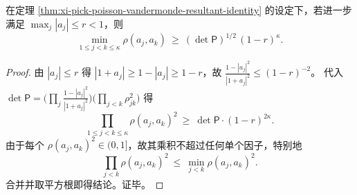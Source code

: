 \begin{corollary}[行列式下界推出伪双曲分离的充分条件]\label{cor:xi-pick-poisson-determinant-separation-sufficient}
在定理 \ref{thm:xi-pick-poisson-vandermonde-resultant-identity} 的设定下，若进一步满足 \(\max_j|a_j|\le r<1\)，则
\[
\min_{1\le j<k\le\kappa}\rho(a_j,a_k)
\ \ge\
(\det\mathsf P)^{1/2}\,(1-r)^{\kappa}.
\]
\end{corollary}
\begin{proof}
由 \(|a_j|\le r\) 得 \(|1+a_j|\ge 1-|a_j|\ge 1-r\)，故
\(
\frac{1-|a_j|^2}{|1+a_j|^2}\le (1-r)^{-2}
\)。
代入 \(\det\mathsf P=\bigl(\prod_j \frac{1-|a_j|^2}{|1+a_j|^2}\bigr)\bigl(\prod_{j<k}\rho_{jk}^2\bigr)\) 得
\[
\prod_{1\le j<k\le\kappa}\rho(a_j,a_k)^2
\ \ge\
\det\mathsf P\cdot (1-r)^{2\kappa}.
\]
由于每个 \(\rho(a_j,a_k)^2\in(0,1]\)，故其乘积不超过任何单个因子，特别地
\[
\prod_{j<k}\rho(a_j,a_k)^2
\ \le\
\min_{j<k}\rho(a_j,a_k)^2.
\]
合并并取平方根即得结论。证毕。
\end{proof}

\endinput
